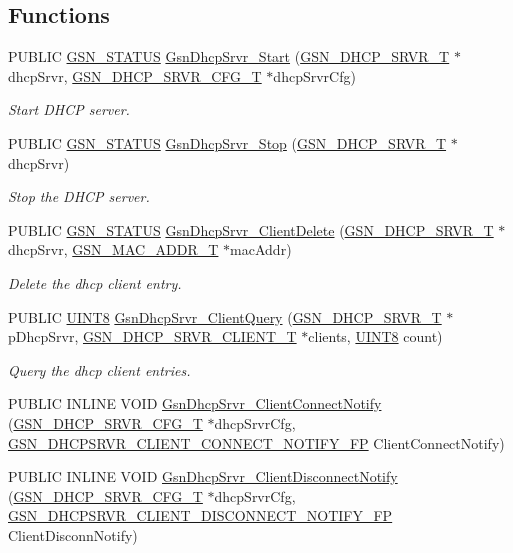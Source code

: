 \subsection*{Functions}
\begin{DoxyCompactItemize}
\item 
PUBLIC \hyperlink{a00660_gada5951904ac6110b1fa95e51a9ddc217}{GSN\_\-STATUS} \hyperlink{a00661_gac04808b6c079b9f20bb2a8d1a3805630}{GsnDhcpSrvr\_\-Start} (\hyperlink{a00043}{GSN\_\-DHCP\_\-SRVR\_\-T} $\ast$dhcpSrvr, \hyperlink{a00044}{GSN\_\-DHCP\_\-SRVR\_\-CFG\_\-T} $\ast$dhcpSrvrCfg)
\begin{DoxyCompactList}\small\item\em Start DHCP server. \end{DoxyCompactList}\item 
PUBLIC \hyperlink{a00660_gada5951904ac6110b1fa95e51a9ddc217}{GSN\_\-STATUS} \hyperlink{a00661_ga1ed16aa486ac47bcaebe60b62132c569}{GsnDhcpSrvr\_\-Stop} (\hyperlink{a00043}{GSN\_\-DHCP\_\-SRVR\_\-T} $\ast$dhcpSrvr)
\begin{DoxyCompactList}\small\item\em Stop the DHCP server. \end{DoxyCompactList}\item 
PUBLIC \hyperlink{a00660_gada5951904ac6110b1fa95e51a9ddc217}{GSN\_\-STATUS} \hyperlink{a00661_ga8fa3791028d92350c2d4ec346a0b8ffe}{GsnDhcpSrvr\_\-ClientDelete} (\hyperlink{a00043}{GSN\_\-DHCP\_\-SRVR\_\-T} $\ast$dhcpSrvr, \hyperlink{a00416}{GSN\_\-MAC\_\-ADDR\_\-T} $\ast$macAddr)
\begin{DoxyCompactList}\small\item\em Delete the dhcp client entry. \end{DoxyCompactList}\item 
PUBLIC \hyperlink{a00660_gab27e9918b538ce9d8ca692479b375b6a}{UINT8} \hyperlink{a00661_ga28fb2f33b4dd3b44f02c5278f081104a}{GsnDhcpSrvr\_\-ClientQuery} (\hyperlink{a00043}{GSN\_\-DHCP\_\-SRVR\_\-T} $\ast$pDhcpSrvr, \hyperlink{a00045}{GSN\_\-DHCP\_\-SRVR\_\-CLIENT\_\-T} $\ast$clients, \hyperlink{a00660_gab27e9918b538ce9d8ca692479b375b6a}{UINT8} count)
\begin{DoxyCompactList}\small\item\em Query the dhcp client entries. \end{DoxyCompactList}\item 
PUBLIC INLINE VOID \hyperlink{a00482_ad786ccf0423ccf61677e29b66ec6fcd4}{GsnDhcpSrvr\_\-ClientConnectNotify} (\hyperlink{a00044}{GSN\_\-DHCP\_\-SRVR\_\-CFG\_\-T} $\ast$dhcpSrvrCfg, \hyperlink{a00482_a4e4c9cdf544b20379a6322b6f2466dd2}{GSN\_\-DHCPSRVR\_\-CLIENT\_\-CONNECT\_\-NOTIFY\_\-FP} ClientConnectNotify)
\item 
PUBLIC INLINE VOID \hyperlink{a00482_a970c900fb376b9a4afe7076ee1aa1a5a}{GsnDhcpSrvr\_\-ClientDisconnectNotify} (\hyperlink{a00044}{GSN\_\-DHCP\_\-SRVR\_\-CFG\_\-T} $\ast$dhcpSrvrCfg, \hyperlink{a00482_a05462468438cc4b6c8ec15d1a0cdecb6}{GSN\_\-DHCPSRVR\_\-CLIENT\_\-DISCONNECT\_\-NOTIFY\_\-FP} ClientDisconnNotify)
\end{DoxyCompactItemize}


